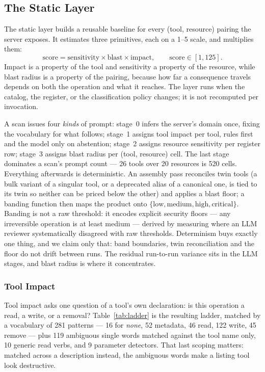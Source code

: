 \documentclass[sigconf]{acmart}
\begin{document}
\subsection{The Static Layer}
\label{sec:static}

The static layer builds a reusable baseline for every (tool, resource) pairing
the server exposes. It estimates three primitives, each on a 1--5 scale, and
multiplies them:
\begin{equation}
\mathrm{score} = \mathrm{sensitivity} \times \mathrm{blast} \times
                 \mathrm{impact}, \qquad \mathrm{score} \in [1, 125].
\label{eq:score}
\end{equation}
Impact is a property of the tool and sensitivity a property of the resource,
while blast radius is a property of the pairing, because how far a consequence
travels depends on both the operation and what it reaches. The layer runs when
the catalog, the register, or the classification policy changes; it is not
recomputed per invocation.

A scan issues four \emph{kinds} of prompt: stage~0 infers the server's domain
once, fixing the vocabulary for what follows; stage~1 assigns tool impact per
tool, rules first and the model only on abstention; stage~2 assigns resource
sensitivity per register row; stage~3 assigns blast radius per (tool, resource)
cell. The last stage dominates a scan's prompt count --- 26 tools over 20
resources is 520 cells. Everything afterwards is deterministic. An assembly pass reconciles
twin tools (a bulk variant of a singular tool, or a deprecated alias of a
canonical one, is tied to its twin so neither can be priced below the other)
and applies a blast floor; a banding function then maps the product onto
$\{\textrm{low}, \textrm{medium}, \textrm{high}, \textrm{critical}\}$. Banding
is not a raw threshold: it encodes explicit security floors --- any
irreversible operation is at least medium --- derived by measuring where an LLM
reviewer systematically disagreed with raw thresholds. Determinism buys exactly
one thing, and we claim only that: band boundaries, twin reconciliation and the
floor do not drift between runs. The residual run-to-run variance sits in the
LLM stages, and blast radius is where it concentrates.

\subsubsection{Tool Impact}
\label{sec:impact}

Tool impact asks one question of a tool's own declaration: is this operation a
read, a write, or a removal? Table~\ref{tab:ladder} is the resulting ladder,
matched by a vocabulary of 281 patterns --- 16 for \emph{none}, 52 metadata, 46
read, 122 write, 45 remove --- plus 119 ambiguous single words matched against
the tool name only, 10 generic read verbs, and 9 parameter detectors. That last
scoping matters: matched across a description instead, the ambiguous words make
a listing tool look destructive.
\end{document}
